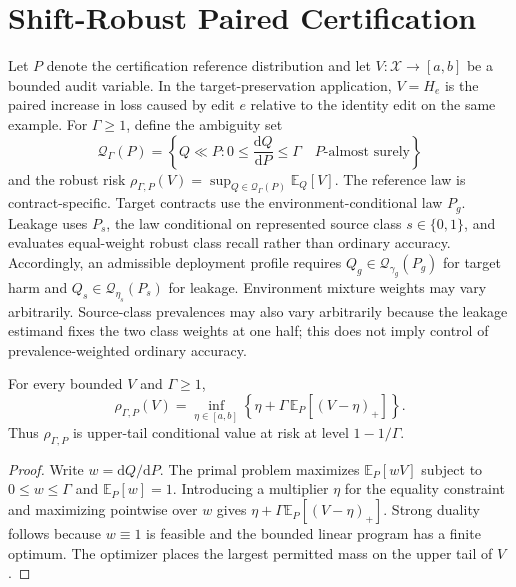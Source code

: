 \section{Shift-Robust Paired Certification}
\label{app:shift-robust-theory}

Let $P$ denote the certification reference distribution and let
$V:\mathcal{X}\to[a,b]$
be a bounded audit variable.  In the target-preservation application,
$V=H_e$ is the paired increase in loss caused by edit $e$ relative to the
identity edit on the same example.  For $\Gamma\geq 1$, define the ambiguity
set
\begin{equation}
  \mathcal{Q}_{\Gamma}(P)=\left\{Q\ll P:
  0\leq \frac{\mathrm{d}Q}{\mathrm{d}P}\leq\Gamma
  \quad P\text{-almost surely}\right\}
\end{equation}
and the robust risk
$\rho_{\Gamma,P}(V)=\sup_{Q\in\mathcal{Q}_{\Gamma}(P)}\mathbb{E}_Q[V]$.
The reference law is contract-specific. Target contracts use the
environment-conditional law $P_g$. Leakage uses $P_s$, the law conditional on
represented source class $s\in\{0,1\}$, and evaluates equal-weight robust
class recall rather than ordinary accuracy. Accordingly, an admissible
deployment profile requires $Q_g\in\mathcal Q_{\gamma_g}(P_g)$ for target
harm and $Q_s\in\mathcal Q_{\eta_s}(P_s)$ for leakage. Environment mixture
weights may vary arbitrarily. Source-class prevalences may also vary
arbitrarily because the leakage estimand fixes the two class weights at one
half; this does not imply control of prevalence-weighted ordinary accuracy.

\begin{lemma}
\label{lem:cvar-identity}
For every bounded $V$ and $\Gamma\geq1$,
\begin{equation}
  \rho_{\Gamma,P}(V)
  =\inf_{\eta\in[a,b]}
  \left\{\eta+\Gamma\,\mathbb{E}_P[(V-\eta)_+]\right\}.
\end{equation}
Thus $\rho_{\Gamma,P}$ is upper-tail conditional value at risk at level
$1-1/\Gamma$.
\end{lemma}

\begin{proof}
Write $w=\mathrm{d}Q/\mathrm{d}P$.  The primal problem maximizes
$\mathbb{E}_P[wV]$ subject to $0\leq w\leq\Gamma$ and
$\mathbb{E}_P[w]=1$.  Introducing a multiplier $\eta$ for the equality
constraint and maximizing pointwise over $w$ gives
$\eta+\Gamma\mathbb{E}_P[(V-\eta)_+]$.  Strong duality follows because
$w\equiv1$ is feasible and the bounded linear program has a finite optimum.
The optimizer places the largest permitted mass on the upper tail of $V$.
\end{proof}

